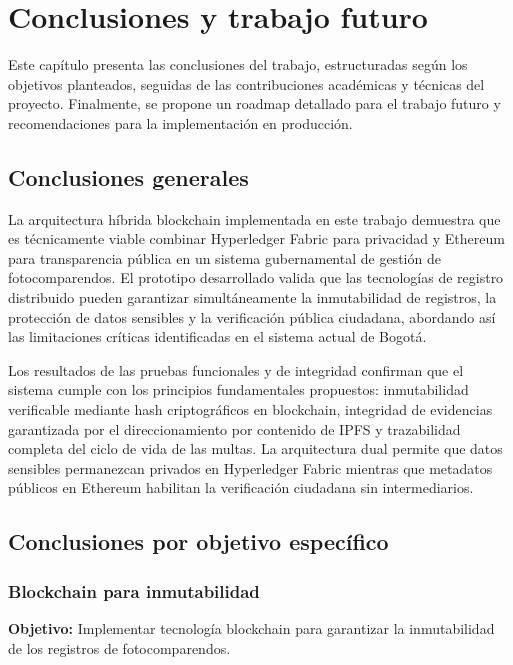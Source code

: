 \section{Conclusiones y trabajo futuro}

Este capítulo presenta las conclusiones del trabajo, estructuradas según los objetivos planteados, seguidas de las contribuciones académicas y técnicas del proyecto. Finalmente, se propone un roadmap detallado para el trabajo futuro y recomendaciones para la implementación en producción.

\subsection{Conclusiones generales}

La arquitectura híbrida blockchain implementada en este trabajo demuestra que es técnicamente viable combinar Hyperledger Fabric para privacidad y Ethereum para transparencia pública en un sistema gubernamental de gestión de fotocomparendos. El prototipo desarrollado valida que las tecnologías de registro distribuido pueden garantizar simultáneamente la inmutabilidad de registros, la protección de datos sensibles y la verificación pública ciudadana, abordando así las limitaciones críticas identificadas en el sistema actual de Bogotá.

Los resultados de las pruebas funcionales y de integridad confirman que el sistema cumple con los principios fundamentales propuestos: inmutabilidad verificable mediante hash criptográficos en blockchain, integridad de evidencias garantizada por el direccionamiento por contenido de IPFS y trazabilidad completa del ciclo de vida de las multas. La arquitectura dual permite que datos sensibles permanezcan privados en Hyperledger Fabric mientras que metadatos públicos en Ethereum habilitan la verificación ciudadana sin intermediarios.

\subsection{Conclusiones por objetivo específico}

\subsubsection{Blockchain para inmutabilidad}

\textbf{Objetivo:} Implementar tecnología blockchain para garantizar la inmutabilidad de los registros de fotocomparendos.


